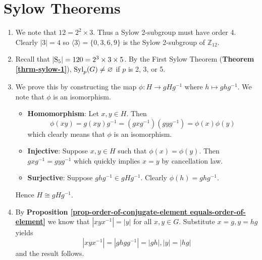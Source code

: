 \section{Sylow Theorems}
\begin{enumerate}
    \item We note that $12 = 2^2 \times 3$. Thus a Sylow 2-subgroup must have order 4. Clearly $|3| = 4$ so $\langle 3 \rangle = \{0, 3, 6, 9\}$ is the Sylow 2-subgroup of $\mathbb{Z}_{12}$.

    \item Recall that $|\mathrm{S}_{5}| = 120 = 2^3 \times 3 \times 5$. By the First Sylow Theorem (\textbf{Theorem \ref{thrm-sylow-1}}), $\mathrm{Syl}_{p}(G) \neq \varnothing$ if $p$ is 2, 3, or 5.

    \item We prove this by constructing the map $\phi: H \to gHg^{-1}$ where $h \mapsto ghg^{-1}$. We note that $\phi$ is an isomorphism.
    \begin{itemize}
        \item \textbf{Homomorphism}: Let $x, y \in H$. Then
        \[
            \phi(xy) = g(xy)g^{-1} = (gxg^{-1})(gyg^{-1}) = \phi(x)\phi(y)
        \]
        which clearly means that $\phi$ is an isomorphism.
        \item \textbf{Injective}: Suppose $x, y \in H$ such that $\phi(x) = \phi(y)$. Then $gxg^{-1} = gyg^{-1}$ which quickly implies $x = y$ by cancellation law.
        \item \textbf{Surjective}: Suppose $ghg^{-1} \in gHg^{-1}$. Clearly $\phi(h) = ghg^{-1}$.
    \end{itemize}
    Hence $H \cong gHg^{-1}$.

    \item By \textbf{Proposition \ref{prop-order-of-conjugate-element equals-order-of-element}} we know that $|xyx^{-1}| = |y|$ for all $x, y \in G$. Substitute $x = g, y = hg$ yields
    \[
        |xyx^{-1}| = |ghgg^{-1}| = |gh|, |y| = |hg|
    \]
    and the result follows.


\end{enumerate}
